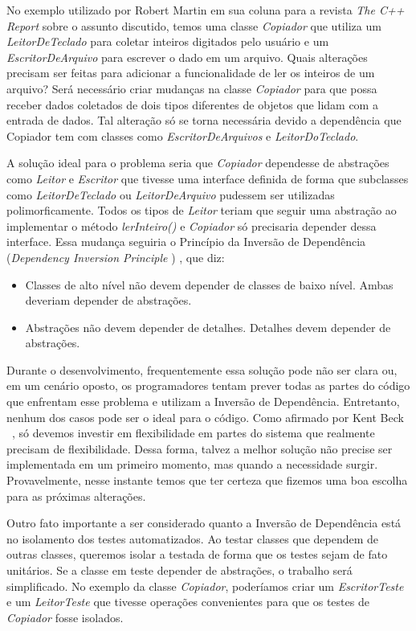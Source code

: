 No exemplo utilizado por Robert Martin em sua coluna para a revista \textit{The C++ Report} \citep{CppReport}
sobre o assunto discutido, temos uma classe  \textit{Copiador} que utiliza um \textit{LeitorDeTeclado} para coletar inteiros digitados pelo usuário e um  \textit{EscritorDeArquivo} para escrever o dado em um arquivo. Quais alterações precisam ser feitas  para adicionar a funcionalidade de ler os inteiros de um arquivo? Será necessário criar mudanças na classe  \textit{Copiador} para que possa receber dados coletados de dois tipos diferentes de objetos que lidam com a entrada de dados. Tal alteração só se torna necessária devido a dependência que Copiador tem com classes como \textit{EscritorDeArquivos} e \textit{LeitorDoTeclado}.
	
A solução ideal para o problema seria que  \textit{Copiador} dependesse de abstrações como \textit{Leitor} e  \textit{Escritor} que tivesse uma interface definida de forma que subclasses como  \textit{LeitorDeTeclado} ou  \textit{LeitorDeArquivo} pudessem ser utilizadas polimorficamente. Todos os tipos de  \textit{Leitor} teriam que seguir uma abstração ao implementar o método  \textit{lerInteiro()} e  \textit{Copiador} só precisaria depender dessa interface. Essa mudança seguiria o Princípio da Inversão de Dependência (\textit{Dependency Inversion Principle} \citep{Martin97c}) , que diz:
	
\begin{itemize}
 	\item Classes de alto nível não devem depender de classes de baixo nível. Ambas deveriam depender de abstrações.
	\item Abstrações não devem depender de detalhes. Detalhes devem depender de abstrações.
\end{itemize}

Durante o desenvolvimento, frequentemente essa solução pode não ser clara ou, em um cenário oposto, os programadores tentam prever todas as partes do código que enfrentam esse problema e utilizam a Inversão de Dependência. Entretanto, nenhum dos casos pode ser o ideal para o código. Como afirmado por Kent Beck ~\citep{Beck2007}, só devemos investir em flexibilidade em partes do sistema que realmente precisam de flexibilidade. Dessa forma, talvez a melhor solução não precise ser implementada em um primeiro momento, mas quando a necessidade surgir. Provavelmente, nesse instante temos que ter certeza que fizemos uma boa escolha para as próximas alterações.

Outro fato importante a ser considerado quanto a Inversão de Dependência está no isolamento dos testes automatizados. Ao testar classes que dependem de outras classes, queremos isolar a testada de forma que os testes sejam de fato unitários. Se a classe em teste depender de abstrações, o trabalho será simplificado. No exemplo da classe \textit{Copiador}, poderíamos criar um \textit{EscritorTeste} e um \textit{LeitorTeste} que tivesse operações convenientes para que os testes de \textit{Copiador} fosse isolados.


